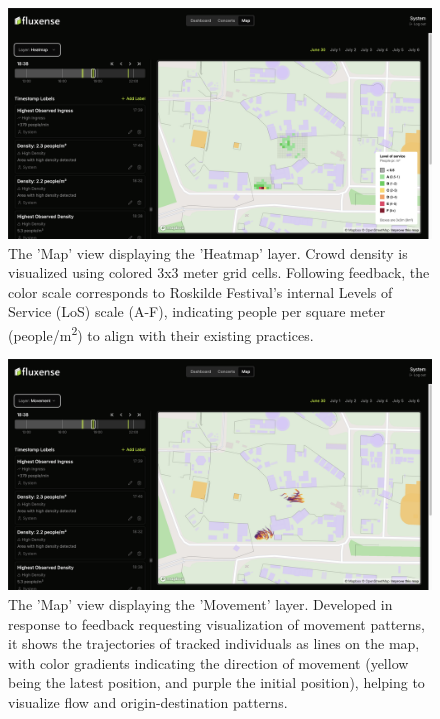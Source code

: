 \begin{figure}[H]
  \centering
  \includegraphics[width=\textwidth]{Pictures/Misc/Frontend/map_density.png}
  \caption{The 'Map' view displaying the 'Heatmap' layer. Crowd density is visualized using colored 3x3 meter grid cells. Following feedback, the color scale corresponds to Roskilde Festival's internal Levels of Service (LoS) scale (A-F), indicating people per square meter (people/m\textsuperscript{2}) to align with their existing practices.}
  \label{fig:showcase:map-density}

\end{figure}

\begin{figure}[H]
  \centering
  \includegraphics[width=\textwidth]{Pictures/Misc/Frontend/map_movement.png}
  \caption{The 'Map' view displaying the 'Movement' layer. Developed in response to feedback requesting visualization of movement patterns, it shows the trajectories of tracked individuals as lines on the map, with color gradients indicating the direction of movement (yellow being the latest position, and purple the initial position), helping to visualize flow and origin-destination patterns.}
  \label{fig:showcase:map-movement}

\end{figure}


